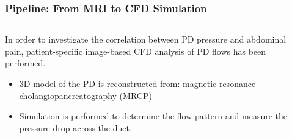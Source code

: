 \documentclass{beamer}
\begin{document}
\begin{frame}
\begin{columns}
\begin{column}{0.65\textwidth}
\begin{columns}
\begin{column}{0.5\textwidth}
                \end{column}
            \end{columns}
        

            
        \end{column}
    \end{columns}



    

\end{frame}






\begin{frame}
    \fontsize{8pt}{10pt}\selectfont
    \frametitle{Pipeline: From MRI to CFD Simulation }
    \vspace{0.02\textwidth}

    \begin{columns}
        \begin{column}{0.6\textwidth}
            In order to investigate the correlation between PD pressure and abdominal pain, 
            patient-specific image-based CFD analysis of PD flows has been performed.
            
            \vspace{0.02\textwidth}


            \begin{itemize}
                \item   3D model of the PD is reconstructed from: magnetic resonance cholangiopancreatography (MRCP)
                \item Simulation is performed to determine the flow pattern and measure the pressure drop across the duct.
            \end{itemize}

            
            
        \end{column}

        \begin{column}{0.4\textwidth}


\end{column}
\end{columns}
\end{frame}
\end{document}
